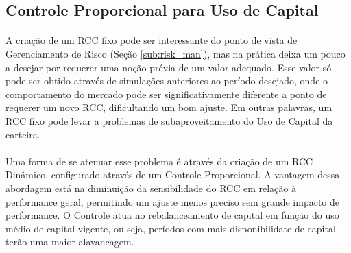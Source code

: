 \FloatBarrier
\subsection{Controle Proporcional para Uso de Capital}
\label{sub:dynamic_rcc}


\paragraph{} A criação de um RCC fixo pode ser interessante do ponto de vista de Gerenciamento de Risco (Seção \ref{sub:risk_man}), mas na prática deixa um pouco a desejar por requerer uma noção prévia de um valor adequado. Esse valor só pode ser obtido através de simulações anteriores ao período desejado, onde o comportamento do mercado pode ser significativamente diferente a ponto de requerer um novo RCC, dificultando um bom ajuste. Em outras palavras, um RCC fixo pode levar a problemas de subaproveitamento do Uso de Capital da carteira.

\paragraph{} Uma forma de se atenuar esse problema é através da criação de um RCC Dinâmico, configurado através de um Controle Proporcional. A vantagem dessa abordagem está na diminuição da sensibilidade do RCC em relação à performance geral, permitindo um ajuste menos preciso sem grande impacto de performance. O Controle atua no rebalanceamento de capital em função do uso médio de capital vigente, ou seja, períodos com mais disponibilidate de capital terão uma maior alavancagem.


